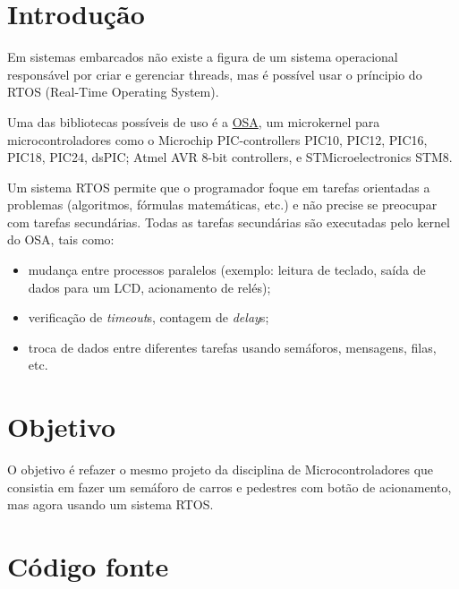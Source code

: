 \section{Introdução}\label{introduuxe7uxe3o}

Em sistemas embarcados não existe a figura de um sistema operacional
responsável por criar e gerenciar threads, mas é possível usar o
príncipio do RTOS (Real-Time Operating System).

Uma das bibliotecas possíveis de uso é a
\href{http://www.pic24.ru/doku.php/en/osa/ref/intro}{OSA}, um
microkernel para microcontroladores como o Microchip PIC-controllers
PIC10, PIC12, PIC16, PIC18, PIC24, dsPIC; Atmel AVR 8-bit controllers, e
STMicroelectronics STM8.

Um sistema RTOS permite que o programador foque em tarefas orientadas a
problemas (algoritmos, fórmulas matemáticas, etc.) e não precise se
preocupar com tarefas secundárias. Todas as tarefas secundárias são
executadas pelo kernel do OSA, tais como:

\begin{itemize}
\itemsep1pt\parskip0pt
\item
  mudança entre processos paralelos (exemplo: leitura de teclado, saída
  de dados para um LCD, acionamento de relés);
\item
  verificação de \emph{timeout}s, contagem de \emph{delay}s;
\item
  troca de dados entre diferentes tarefas usando semáforos, mensagens,
  filas, etc.
\end{itemize}

\section{Objetivo}\label{objetivo}

O objetivo é refazer o mesmo projeto da disciplina de Microcontroladores
que consistia em fazer um semáforo de carros e pedestres com botão de
acionamento, mas agora usando um sistema RTOS.

\section{Código fonte}\label{cuxf3digo-fonte}

